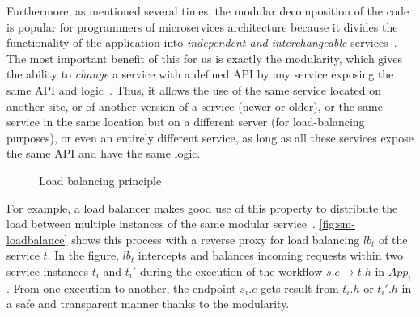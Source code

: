 Furthermore, as mentioned several times, the modular decomposition of
the code is popular for programmers of microservices architecture
because it divides the functionality of the application into
\emph{independent and interchangeable} services~\cite{Lis72}.
%
%
The most important benefit of this for us is exactly the modularity,
which gives the ability to \emph{change} a service with a defined API
by any service exposing the same API and logic~\cite{Par72}.
%
Thus, it allows the use of the same service located on another
site, or of another version of a service (newer or older), or the
same service in the same location but on a different server (for
load-balancing purposes), or even an entirely different service, as
long as all these services expose the same API and have the same
logic.

\begin{figure}[htbp]
  \centering
  \caption{Load balancing principle}
  \label{fig:sm-loadbalance}
\end{figure}

For example, a load balancer makes good use of this property to
distribute the load between multiple instances of the same modular
service~\cite{Fie00}.
%
\autoref{fig:sm-loadbalance} shows this process with a reverse proxy
for load balancing $lb_t$ of the service $t$.
%
In the figure, $lb_t$ intercepts and balances incoming requests
within two service instances $t_i$ and $t_i'$ during the execution of
the workflow $s.e \rightarrow t.h$ in $App_i$.
%
From one execution to another, the endpoint $s_i.e$ gets result from
$t_i.h$ or $t_i'.h$ in a safe and transparent manner thanks to the
modularity.



